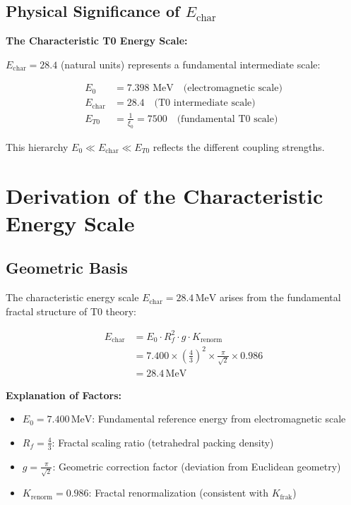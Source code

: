 	\subsection{Physical Significance of $E_{\text{char}}$}
	
	\begin{keyresult}
		\textbf{The Characteristic T0 Energy Scale:}
		
		$E_{\text{char}} = 28.4$ (natural units) represents a fundamental intermediate scale:
		
		\begin{align}
			E_0 &= 7.398 \text{ MeV} \quad \text{(electromagnetic scale)} \\
			E_{\text{char}} &= 28.4 \quad \text{(T0 intermediate scale)} \\
			E_{T0} &= \frac{1}{\xi_0} = 7500 \quad \text{(fundamental T0 scale)}
		\end{align}
		
		This hierarchy $E_0 \ll E_{\text{char}} \ll E_{T0}$ reflects the different coupling strengths.
	\end{keyresult}
	
	\section{Derivation of the Characteristic Energy Scale}
	
	\subsection{Geometric Basis}
	
	The characteristic energy scale $E_{\text{char}} = 28.4\,\text{MeV}$ arises from the fundamental fractal structure of T0 theory:
	
	\begin{align}
		E_{\text{char}} &= E_0 \cdot R_f^2 \cdot g \cdot K_{\text{renorm}} \\
		&= 7.400 \times \left(\frac{4}{3}\right)^2 \times \frac{\pi}{\sqrt{2}} \times 0.986 \\
		&= 28.4\,\text{MeV}
	\end{align}
	
	\textbf{Explanation of Factors:}
	\begin{itemize}
		\item $E_0 = 7.400\,\text{MeV}$: Fundamental reference energy from electromagnetic scale
		\item $R_f = \frac{4}{3}$: Fractal scaling ratio (tetrahedral packing density)  
		\item $g = \frac{\pi}{\sqrt{2}}$: Geometric correction factor (deviation from Euclidean geometry)
		\item $K_{\text{renorm}} = 0.986$: Fractal renormalization (consistent with $K_{\text{frak}}$)
	\end{itemize}
	

